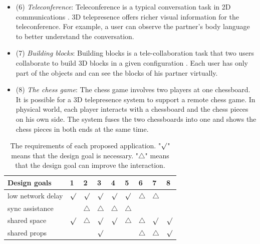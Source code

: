 \begin{itemize}
    \item (6) \emph{Teleconference}: Teleconference is a typical conversation task in 2D communications \cite{allen1996teleconferencing, marlow2016beyond}. 3D telepresence offers richer visual information for the teleconference. For example, a user can observe the partner's body language to better understand the conversation.
    
    \item (7) \emph{Building blocks}: Building blocks is a tele-collaboration task that two users collaborate to build 3D blocks in a given configuration \cite{orts2016holoportation}. Each user has only part of the objects and can see the blocks of his partner virtually.
    
    \item (8) \emph{The chess game}: The chess game involves two players at one chessboard. It is possible for a 3D telepresence system to support a remote chess game. In physical world, each player interacts with a chessboard and the chess pieces on his own side. The system fuses the two chessboards into one and shows the chess pieces in both ends at the same time.
\end{itemize}{}

\begin{table}[!htbp]
\begin{tabular}{|l|l|l|l|l|l|l|l|l|}
\hline
\textbf{Design goals} & 1       & 2           & 3           & 4           & 5           & 6           & 7           & 8       \\ \hline
low network delay                      & $\surd$ & $\surd$     & $\surd$     & $\surd$     & $\surd$     & $\triangle$ & $\triangle$ &         \\ \hline
sync assistance                        &         & $\triangle$ & $\triangle$ & $\triangle$ & $\triangle$ &             &             &         \\ \hline
shared space                           & $\surd$ & $\triangle$ & $\surd$     & $\surd$     & $\triangle$ & $\triangle$ & $\surd$     & $\surd$ \\ \hline
shared props                           &         &             & $\surd$     &             &             & $\triangle$ & $\triangle$ & $\surd$ \\ \hline
\end{tabular}
\caption{The requirements of each proposed application. "$\surd$" means that the design goal is necessary. "$\triangle$" means that the design goal can improve the interaction.}
\label{tab:brainstorming}
\end{table}

